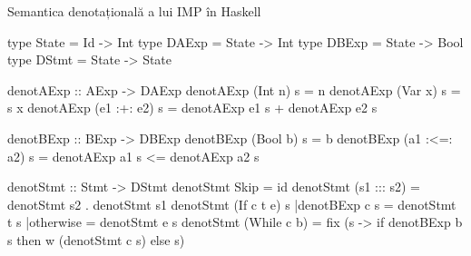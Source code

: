 \documentclass[xcolor=pdftex,romanian,colorlinks]{beamer}
\begin{document}
\begin{frame}[fragile]{Semantica denotațională a lui IMP în Haskell}
\begin{minipage}{.46\columnwidth}
\begin{asciihs}
type State = Id -> Int
type DAExp = State -> Int
type DBExp = State -> Bool
type DStmt = State -> State

denotAExp :: AExp -> DAExp
denotAExp (Int n) s = n
denotAExp (Var x) s = s x
denotAExp (e1 :+: e2) s
  = denotAExp e1 s
  + denotAExp e2 s

denotBExp :: BExp -> DBExp
denotBExp (Bool b) s = b
denotBExp (a1 :<=: a2) s
  = denotAExp a1 s
  <= denotAExp a2 s

\end{asciihs}
\end{minipage}
\begin{minipage}{.53\columnwidth}
\begin{asciihs}
denotStmt :: Stmt -> DStmt
denotStmt Skip = id
denotStmt (s1 ::: s2) =
  denotStmt s2 . denotStmt s1
denotStmt (If c t e) s
 |denotBExp c s = denotStmt t s
 |otherwise     = denotStmt e s
denotStmt (While c b) =
  fix (\w s ->
    if denotBExp b s
      then w (denotStmt c s)
      else s)
\end{asciihs}
\end{minipage}
\end{frame}
\end{document}
